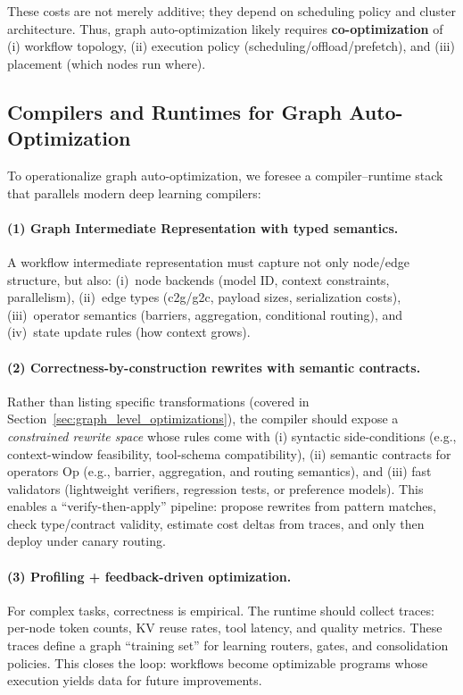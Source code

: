 These costs are not merely additive; they depend on scheduling policy and cluster architecture. Thus, graph auto-optimization likely requires \textbf{co-optimization} of (i) workflow topology, (ii) execution policy (scheduling/offload/prefetch), and (iii) placement (which nodes run where).

\subsection{Compilers and Runtimes for Graph Auto-Optimization}
\label{sec:compilers_runtimes}

To operationalize graph auto-optimization, we foresee a compiler--runtime stack that parallels modern deep learning compilers:

\paragraph{(1) Graph Intermediate Representation with typed semantics.}
A workflow intermediate representation must capture not only node/edge structure, but also:
(i)~node backends (model ID, context constraints, parallelism),
(ii)~edge types (c2g/g2c, payload sizes, serialization costs),
(iii)~operator semantics (barriers, aggregation, conditional routing),
and (iv)~state update rules (how context grows).

\paragraph{(2) Correctness-by-construction rewrites with semantic contracts.}
Rather than listing specific transformations (covered in Section~\ref{sec:graph_level_optimizations}),
the compiler should expose a \emph{constrained rewrite space} whose rules come with
(i) syntactic side-conditions (e.g., context-window feasibility, tool-schema compatibility),
(ii) semantic contracts for operators $\text{Op}$ (e.g., barrier, aggregation, and routing semantics),
and (iii) fast validators (lightweight verifiers, regression tests, or preference models).
This enables a ``verify-then-apply'' pipeline: propose rewrites from pattern matches, check type/contract
validity, estimate cost deltas from traces, and only then deploy under canary routing.

\paragraph{(3) Profiling + feedback-driven optimization.}
For complex tasks, correctness is empirical. The runtime should collect traces:
per-node token counts, KV reuse rates, tool latency, and quality metrics.
These traces define a graph ``training set'' for learning routers, gates, and consolidation policies. This closes the loop: workflows become optimizable programs whose execution yields data for future improvements.

